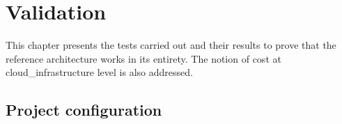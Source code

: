 

\chapter{Validation}
\label{chap:validation}

This chapter presents the tests carried out and their results to prove that the reference architecture works in its entirety. The notion of cost at \gls{cloud_infrastructure} level is also addressed. 

\minitoc
\newpage

\section{Project configuration}

